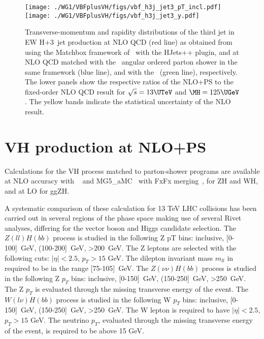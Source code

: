 %
\begin{figure}
\texttt{[image: ./WG1/VBFplusVH/figs/vbf\_h3j\_jet3\_pT\_incl.pdf]}
\hfill
\texttt{[image: ./WG1/VBFplusVH/figs/vbf\_h3j\_jet3\_y.pdf]}
\caption{Transverse-momentum and rapidity distributions of the third jet in EW H+3~jet production at NLO QCD (red line)  as obtained from using the \textsf{Matchbox} framework 
of \ with the \textsf{HJets++} plugin, and at NLO QCD matched with the 
\ angular ordered parton shower in the same framework (blue line), 
and with the \POWHEGBOX\ (green line), respectively. The lower panels show the respective ratios of the NLO+PS to the fixed-order NLO QCD result for $\sqrt{s}=13\UTeV$ and $\MH=125\UGeV$. The yellow bands indicate the statistical uncertainty of the NLO result. }
\label{fig:SM-VBF-H3j-jet3}
\end{figure}
%


\clearpage
\section{VH production at NLO+PS}
%
Calculations for the VH process matched to parton-shower programs 
are available at NLO accuracy with \POWHEGBOX~\cite{Nason:2009ai} and {\sc MG5\_aMC}~\cite{} 
with FxFx merging~\cite{Frederix:2012ps,Frederix:2015eii}, for ZH and WH,
and at LO for ggZH.
%

A systematic comparison of these calculation for 13 TeV LHC collisions
has been carried out in several regions of the phase space
making use of several Rivet~\cite{rivet} analyses, differing for the vector boson and Higgs candidate selection.
The $Z(ll)H(bb)$ process is studied in the following Z pT bins: inclusive, [0-100]~GeV, (100-200]~GeV, >200~GeV.
The Z leptons are selected with the following cuts: $|\eta| <2.5$, $p_{T} > 15$ GeV.
The dilepton invariant mass $m_{ll}$ in required to be in the range [75-105]~GeV.
The $Z(\nu\nu)H(bb)$ process is studied in the following Z $p_{T}$ bins: inclusive, [0-150]~GeV, (150-250]~GeV, >250~GeV.
The Z $p_{T}$ is evaluated through the missing transverse energy of the event.
The $W(l\nu)H(bb)$ process is studied in the following W $p_{T}$ bins: inclusive, [0-150]~GeV, (150-250]~GeV, >250~GeV.
The W lepton is required to have $|\eta|<2.5$, $p_{T} > 15$ GeV.
The neutrino $p_{T}$, evaluated through the missing transverse energy of the event, is required to be above 15 GeV.

